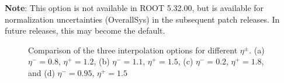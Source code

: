 \documentclass{cernrep}
\begin{document}
\textbf{Note}: This option is not available in ROOT 5.32.00, but is available for normalization uncertainties (OverallSys) in the subsequent patch releases.  In future releases, this may become the default.

      
\begin{figure}[h]
\begin{center}
\caption{Comparison of the three interpolation options for different $\eta^\pm$.  (a) $\eta^-=0.8$, $\eta^+=1.2$, (b) $\eta^-=1.1$, $\eta^+=1.5$, (c) $\eta^-=0.2$, $\eta^+=1.8$, and (d) $\eta^-=0.95$, $\eta^+=1.5$}
\label{fig:interp1d}
\end{center}
\end{figure}
\end{document}
